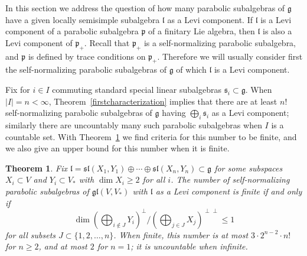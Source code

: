 \documentclass{amsart}
\newtheorem{theorem}{Theorem}[section]
\theoremstyle{definition}
\theoremstyle{remark}
\numberwithin{equation}{section}
\def\gl{\mathfrak {gl}}
\def\g{\mathfrak {g}}
\def\l{\mathfrak {l}}
\def\p{\mathfrak {p}}
\def\sl{\mathfrak{sl}}
\def\s{\mathfrak{s}}
\begin{document}
In this section we address the question of how many parabolic subalgebras of $\g$ have a given locally semisimple subalgebra $\l$ as a Levi component.  If $\l$ is a Levi component of a parabolic subalgebra $\p$ of a finitary Lie algebra, then $\l$ is also a Levi component of $\p_+$.  Recall that $\p_+$ is a self-normalizing parabolic subalgebra, and $\p$ is defined by trace conditions on $\p_+$.
Therefore we will usually consider first the self-normalizing parabolic subalgebras of $\g$ of which $\l$ is a Levi component.

Fix for $i \in I$ commuting standard special linear subalgebras $\s_i \subset \g$.   When $|I| = n < \infty$, Theorem~\ref{firstcharacterization} implies that there are at least $n!$ self-normalizing parabolic subalgebras of $\g$ having $\bigoplus_i \s_i$ as a Levi component; similarly there are uncountably many such parabolic subalgebras when $I$ is a countable set.  With Theorem~\ref{nblocks} we find criteria for this number to be finite, and we also give an upper bound for this number when it is finite.


\begin{theorem}\label{nblocks}
Fix $\l = \sl(X_1,Y_1) \oplus \cdots \oplus \sl(X_n,Y_n) \subset \g$ for some subspaces $X_i \subset V$ and $Y_i \subset V_*$ with $\dim X_i \geq 2$ for all $i$.  The number of self-normalizing parabolic subalgebras of $\gl(V,V_*)$ with $\l$ as a Levi component is finite if and only if
$$\dim (\bigoplus_{i \notin J} Y_i)^\perp / (\bigoplus_{j \in J} X_j)^{\perp \perp} \leq 1$$
for all subsets $J \subset \{ 1, 2, \ldots, n \}$.  When finite, this number is at most $3 \cdot 2^{n-2} \cdot n!$ for $n \geq 2$, and at most $2$ for $n = 1$; it is uncountable when infinite.
\end{theorem}
\end{document}
